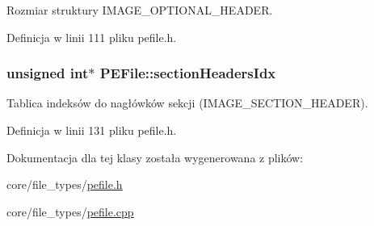 Rozmiar struktury I\-M\-A\-G\-E\-\_\-\-O\-P\-T\-I\-O\-N\-A\-L\-\_\-\-H\-E\-A\-D\-E\-R. 



Definicja w linii 111 pliku pefile.\-h.

\hypertarget{class_p_e_file_a30065d3448d3f6f71cb18dd0ea954be2}{
\subsubsection[{section\-Headers\-Idx}]{\setlength{\rightskip}{0pt plus 5cm}unsigned int$\ast$ P\-E\-File\-::section\-Headers\-Idx\hspace{0.3cm}{\ttfamily [private]}}}\label{class_p_e_file_a30065d3448d3f6f71cb18dd0ea954be2}


Tablica indeksów do nagłówków sekcji (I\-M\-A\-G\-E\-\_\-\-S\-E\-C\-T\-I\-O\-N\-\_\-\-H\-E\-A\-D\-E\-R). 



Definicja w linii 131 pliku pefile.\-h.



Dokumentacja dla tej klasy została wygenerowana z plików\-:\begin{DoxyCompactItemize}
\item 
core/file\-\_\-types/\hyperlink{pefile_8h}{pefile.\-h}\item 
core/file\-\_\-types/\hyperlink{pefile_8cpp}{pefile.\-cpp}\end{DoxyCompactItemize}
